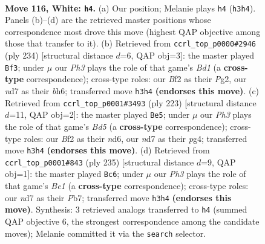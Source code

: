 \documentclass[11pt]{article}
\begin{document}
\clearpage

\begin{figure}[p]\centering
\begin{subfigure}{0.46\textwidth}\centering
\resizebox{\linewidth}{!}{%
\newchessgame
\chessboard[
  setfen={6k1/3n4/8/5PK1/p7/P6P/5B2/8 w - - 51 116},
  showmover=false,
  pgfstyle=straightmove, color=movearrow, markmove={h3-h4}
]}
\caption{}
\end{subfigure}\hfill
\begin{subfigure}{0.46\textwidth}\centering
\resizebox{\linewidth}{!}{%
\newchessgame
\chessboard[
  setfen={8/k7/7b/8/7p/P6P/1K4P1/3B4 w - - 69 118},
  showmover=false,
  pgfstyle=straightmove, color=movearrow, markmove={d1-f3}
]}
\caption{}
\end{subfigure}
\\[4pt]
\begin{subfigure}{0.46\textwidth}\centering
\resizebox{\linewidth}{!}{%
\newchessgame
\chessboard[
  setfen={8/8/3N2k1/6p1/3b2P1/2p5/2P1K3/8 b - - 0 112},
  showmover=false,
  pgfstyle=straightmove, color=movearrow, markmove={d4-e5}
]}
\caption{}
\end{subfigure}\hfill
\begin{subfigure}{0.46\textwidth}\centering
\resizebox{\linewidth}{!}{%
\newchessgame
\chessboard[
  setfen={4b3/1p5k/8/8/5K2/1p6/1P3B2/8 b - - 5 118},
  showmover=false,
  pgfstyle=straightmove, color=movearrow, markmove={e8-c6}
]}
\caption{}
\end{subfigure}
\caption{\textbf{Move 116, White: \texttt{h4}.} (a) Our position; Melanie plays \texttt{h4} (\texttt{h3h4}). Panels (b)--(d) are the retrieved master positions whose correspondence most drove this move (highest QAP objective among those that transfer to it). (b) Retrieved from \texttt{ccrl\_top\_p0000\#2946} (ply 234) [structural distance $d$=6, QAP obj=3]: the master played \texttt{Bf3}; under $\mu$ our \emph{Ph3} plays the role of that game's \emph{Bd1} (a \textbf{cross-type} correspondence); cross-type roles: our \emph{B}f2 as their \emph{P}g2, our \emph{n}d7 as their \emph{b}h6; transferred move \texttt{h3h4} \textbf{(endorses this move)}. (c) Retrieved from \texttt{ccrl\_top\_p0001\#3493} (ply 223) [structural distance $d$=11, QAP obj=2]: the master played \texttt{Be5}; under $\mu$ our \emph{Ph3} plays the role of that game's \emph{Bd5} (a \textbf{cross-type} correspondence); cross-type roles: our \emph{B}f2 as their \emph{n}d6, our \emph{n}d7 as their \emph{p}g4; transferred move \texttt{h3h4} \textbf{(endorses this move)}. (d) Retrieved from \texttt{ccrl\_top\_p0001\#843} (ply 235) [structural distance $d$=9, QAP obj=1]: the master played \texttt{Bc6}; under $\mu$ our \emph{Ph3} plays the role of that game's \emph{Be1} (a \textbf{cross-type} correspondence); cross-type roles: our \emph{n}d7 as their \emph{P}b7; transferred move \texttt{h3h4} \textbf{(endorses this move)}. Synthesis: 3 retrieved analogs transferred to \texttt{h4} (summed QAP objective 6, the strongest correspondence among the candidate moves); Melanie committed it via the \texttt{search} selector.}
\label{fig:thought-m230}
\end{figure}
\end{document}
